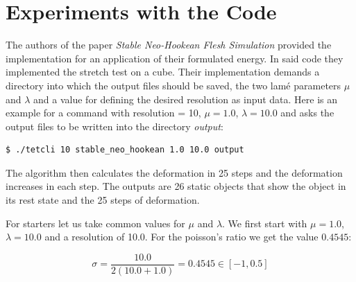 

\section{Experiments with the Code}
The authors of the paper \textit{Stable Neo-Hookean Flesh Simulation} \cite{Smith:2018:SNF:3191713.3180491} provided the implementation for an application of their formulated energy. In said code they implemented the stretch test on a cube. Their implementation demands a directory into which the output files should be saved, the two lamé parameters $\mu$ and $\lambda$ and a value for defining the desired resolution as input data. Here is an example for a command with resolution = 10, $\mu=1.0$, $\lambda=10.0$ and asks the output files to be written into the directory \textit{output}:
\begin{lstlisting}[language=bash]
$ ./tetcli 10 stable_neo_hookean 1.0 10.0 output
\end{lstlisting}

The algorithm then calculates the deformation in 25 steps and the deformation increases in each step. The outputs are 26 static objects that show the object in its rest state and the 25 steps of deformation.



For starters let us take common values for $\mu$ and $\lambda$. We first start with $\mu = 1.0$, $\lambda = 10.0$ and a resolution of 10.0. For the poisson's ratio we get the value $0.4545$:

\[ \sigma =  \frac{10.0}{2 (10.0 + 1.0)} = 0.4545 \in [-1, 0.5] \]



